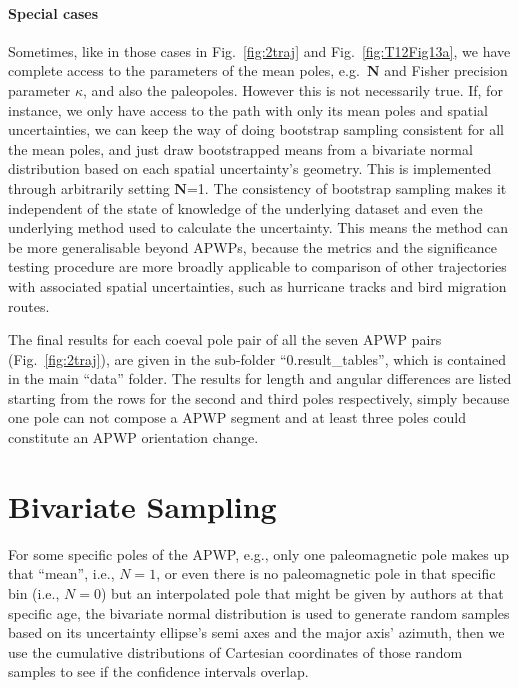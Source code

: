 \paragraph{Special cases} Sometimes, like in those cases in Fig.~\ref{fig:2traj}
and Fig.~\ref{fig:T12Fig13a}, we have complete access to the parameters of the
mean poles, e.g.\ $\mathbf{N}$ and Fisher precision parameter $\kappa$, and also
the paleopoles. However this is not necessarily true. If, for instance, we only
have access to the path with only its mean poles and spatial uncertainties, we
can keep the way of doing bootstrap sampling consistent for all the mean poles,
and just draw bootstrapped means from a bivariate normal distribution based on
each spatial uncertainty's geometry. This is implemented through arbitrarily
setting $\mathbf{N}$=1. The consistency of bootstrap sampling makes it
independent of the state of knowledge of the underlying dataset and even the
underlying method used to calculate the uncertainty. This means the method can
be more generalisable beyond APWPs, because the metrics and the significance
testing procedure are more broadly applicable to comparison of other
trajectories with associated spatial uncertainties, such as hurricane tracks and
bird migration routes.

The final results for each coeval pole pair of all the seven APWP pairs
(Fig.~\ref{fig:2traj}), are given in the sub-folder ``0.result\_tables'', which
is contained in the main ``data'' folder. The results for length and angular
differences are listed starting from the rows for the second and third poles
respectively, simply because one pole can not compose a APWP segment and at
least three poles could constitute an APWP orientation change.

\section{Bivariate Sampling}\label{sec:biv}
For some specific poles of the APWP, e.g., only one paleomagnetic pole makes up
that ``mean'', i.e., $N=1$, or even there is no paleomagnetic pole in that
specific bin (i.e., $N=0$) but an interpolated pole that might be given by
authors at that specific age, the bivariate normal distribution is used to
generate random samples based on its uncertainty ellipse's semi axes and the
major axis' azimuth, then we use the cumulative distributions of Cartesian
coordinates of those random samples to see if the confidence intervals overlap.

